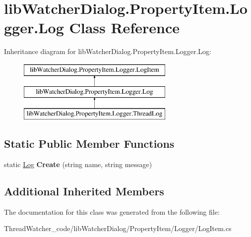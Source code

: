 \hypertarget{classlib_watcher_dialog_1_1_property_item_1_1_logger_1_1_log}{\section{lib\+Watcher\+Dialog.\+Property\+Item.\+Logger.\+Log Class Reference}
\label{classlib_watcher_dialog_1_1_property_item_1_1_logger_1_1_log}
}
Inheritance diagram for lib\+Watcher\+Dialog.\+Property\+Item.\+Logger.\+Log\+:\begin{figure}[H]
\begin{center}
\leavevmode
\includegraphics[height=3.000000cm]{classlib_watcher_dialog_1_1_property_item_1_1_logger_1_1_log}
\end{center}
\end{figure}
\subsection*{Static Public Member Functions}
\begin{DoxyCompactItemize}
\item 
\hypertarget{classlib_watcher_dialog_1_1_property_item_1_1_logger_1_1_log_af538b22e86d3e0aceb3726fc9c06aa0d}{static \hyperlink{classlib_watcher_dialog_1_1_property_item_1_1_logger_1_1_log}{Log} {\bfseries Create} (string name, string message)}\label{classlib_watcher_dialog_1_1_property_item_1_1_logger_1_1_log_af538b22e86d3e0aceb3726fc9c06aa0d}

\end{DoxyCompactItemize}
\subsection*{Additional Inherited Members}


The documentation for this class was generated from the following file\+:\begin{DoxyCompactItemize}
\item 
Thread\+Watcher\+\_\+code/lib\+Watcher\+Dialog/\+Property\+Item/\+Logger/Log\+Item.\+cs\end{DoxyCompactItemize}
